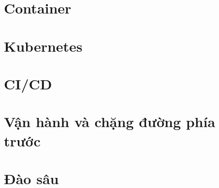 \documentclass[11pt,twoside,openany]{book}
\begin{document}
\part{Container}



\part{Kubernetes}








\part{CI/CD}




\part{Vận hành và chặng đường phía trước}





\part{Đào sâu}












\appendix




\end{document}
